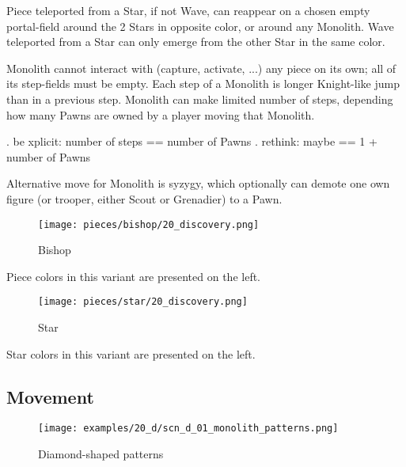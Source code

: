 Piece teleported from a Star, if not Wave, can reappear on a chosen empty
portal-field around the 2 Stars in opposite color, or around any Monolith.
Wave teleported from a Star can only emerge from the other Star in the same
color.

Monolith cannot interact with (capture, activate, ...) any piece on its own;
all of its step-fields must be empty. Each step of a Monolith is longer
Knight-like jump than in a previous step. Monolith can make limited number of
steps, depending how many Pawns are owned by a player moving that Monolith.

\TODO {}. be xplicit: number of steps == number of Pawns . rethink: maybe == 1 + number of Pawns %

Alternative move for Monolith is syzygy, which optionally can demote one own
figure (or trooper, either Scout or Grenadier) to a Pawn.

\clearpage %

\noindent
\begin{wrapfigure}[2]{l}{0.4\textwidth}
\centering
\texttt{[image: pieces/bishop/20\_discovery.png]}
\caption{Bishop}
\label{fig:bishop/20_discovery}
\end{wrapfigure}
Piece colors in this variant are presented on the left.

\vspace*{9.7\baselineskip}
\noindent
\begin{wrapfigure}[2]{l}{0.4\textwidth}
\centering
\texttt{[image: pieces/star/20\_discovery.png]}
\caption{Star}
\label{fig:star/20_discovery}
\end{wrapfigure}
Star colors in this variant are presented on the left.

\clearpage %

\subsection*{Movement}
\label{sec:Discovery/Monolith/Movement}

\vspace*{-1.4\baselineskip}
\noindent
\begin{figure}[!h]
\texttt{[image: examples/20\_d/scn\_d\_01\_monolith\_patterns.png]}
\vspace*{-1.3\baselineskip}
\caption{Diamond-shaped patterns}
\label{fig:scn_d_01_monolith_patterns}
\end{figure}

